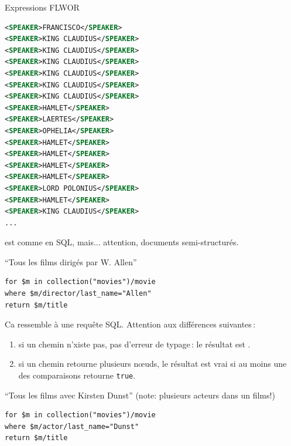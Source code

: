 \begin{frame}{Expressions FLWOR }
\begin{lstlisting}[language=XML,basicstyle=\tiny]
<SPEAKER>FRANCISCO</SPEAKER>
<SPEAKER>KING CLAUDIUS</SPEAKER>
<SPEAKER>KING CLAUDIUS</SPEAKER>
<SPEAKER>KING CLAUDIUS</SPEAKER>
<SPEAKER>KING CLAUDIUS</SPEAKER>
<SPEAKER>KING CLAUDIUS</SPEAKER>
<SPEAKER>KING CLAUDIUS</SPEAKER>
<SPEAKER>HAMLET</SPEAKER>
<SPEAKER>LAERTES</SPEAKER>
<SPEAKER>OPHELIA</SPEAKER>
<SPEAKER>HAMLET</SPEAKER>
<SPEAKER>HAMLET</SPEAKER>
<SPEAKER>HAMLET</SPEAKER>
<SPEAKER>HAMLET</SPEAKER>
<SPEAKER>LORD POLONIUS</SPEAKER>
<SPEAKER>HAMLET</SPEAKER>
<SPEAKER>KING CLAUDIUS</SPEAKER>
...
\end{lstlisting}

\framebreak


 est comme en SQL, mais... attention, documents semi-structurés. 

\vfill

``Tous les films dirigés par W. Allen''

\begin{lstlisting}[language=myXQuery]
for $m in collection("movies")/movie
where $m/director/last_name="Allen"
return $m/title
\end{lstlisting}

Ca ressemble à une requête SQL. Attention aux différences suivantes\,:
\begin{enumerate}
  \item si un chemin n'xiste pas, pas d'erreur de typage\,: le résultat est .

  \item si un chemin retourne plusieurs nœuds, le résultat est vrai 
  si \alert{au moins} une des comparaisons retourne \texttt{true}.

\end{enumerate}

\vfill

``Tous les films avec Kirsten Dunst'' (note: plusieurs acteurs dans un films!)
\begin{lstlisting}[language=myXQuery]
for $m in collection("movies")/movie
where $m/actor/last_name="Dunst"
return $m/title
\end{lstlisting}

\end{frame}


